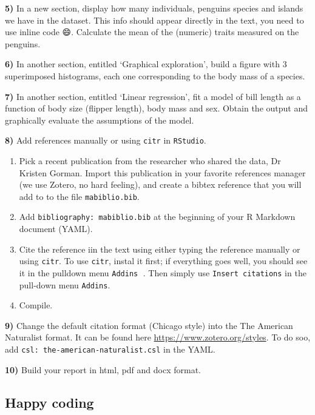 \documentclass[
  12pt,
]{book}
\providecommand{\tightlist}{%
  \setlength{\itemsep}{0pt}\setlength{\parskip}{0pt}}
\begin{document}
\textbf{5)} In a new section, display how many individuals, penguins species and islands we have in the dataset. This info should appear directly in the text, you need to use inline code 😄. Calculate the mean of the (numeric) traits measured on the penguins.

\textbf{6)} In another section, entitled `Graphical exploration', build a figure with 3 superimposed histograms, each one corresponding to the body mass of a species.

\textbf{7)} In another section, entitled `Linear regression', fit a model of bill length as a function of body size (flipper length), body mass and sex. Obtain the output and graphically evaluate the assumptions of the model.

\textbf{8)} Add references manually or using \texttt{citr} in \texttt{RStudio}.

\begin{enumerate}
\def\labelenumi{\arabic{enumi}.}
\tightlist
\item
  Pick a recent publication from the researcher who shared the data, Dr Kristen Gorman. Import this publication in your favorite references manager (we use Zotero, no hard feeling), and create a bibtex reference that you will add to to the file \texttt{mabiblio.bib}.
\item
  Add \texttt{bibliography:\ mabiblio.bib} at the beginning of your R Markdown document (YAML).
\item
  Cite the reference iin the text using either typing the reference manually or using \texttt{citr}. To use \texttt{citr}, instal it first; if everything goes well, you should see it in the pulldown menu \texttt{Addins} 💪. Then simply use \texttt{Insert\ citations} in the pull-down menu \texttt{Addins}.
\item
  Compile.
\end{enumerate}

\textbf{9)} Change the default citation format (Chicago style) into the The American Naturalist format. It can be found here \url{https://www.zotero.org/styles}. To do soo, add \texttt{csl:\ the-american-naturalist.csl} in the YAML.

\textbf{10)} Build your report in html, pdf and docx format. 🎉

\hypertarget{happy-coding}{%
\subsection{Happy coding}\label{happy-coding}}
\end{document}
